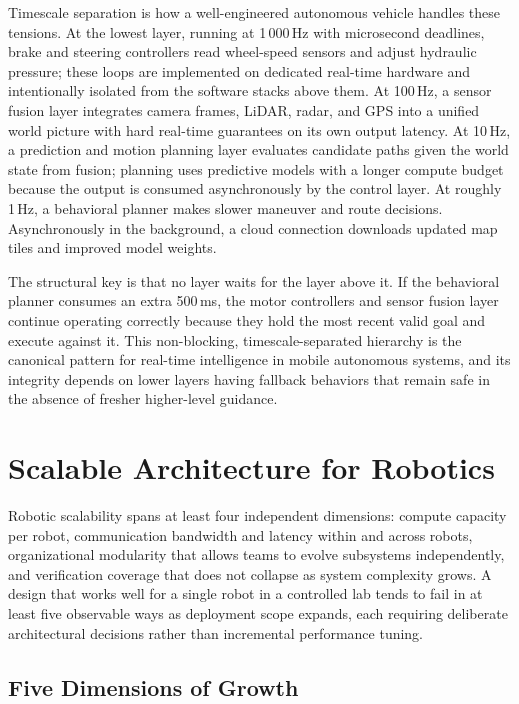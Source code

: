 \documentclass[smallextended]{svjour3}
\begin{document}
Timescale separation is how a well-engineered autonomous vehicle handles these tensions. At the lowest layer, running at 1\,000\,Hz with microsecond deadlines, brake and steering controllers read wheel-speed sensors and adjust hydraulic pressure; these loops are implemented on dedicated real-time hardware and intentionally isolated from the software stacks above them. At 100\,Hz, a sensor fusion layer integrates camera frames, LiDAR, radar, and GPS into a unified world picture with hard real-time guarantees on its own output latency. At 10\,Hz, a prediction and motion planning layer evaluates candidate paths given the world state from fusion; planning uses predictive models with a longer compute budget because the output is consumed asynchronously by the control layer. At roughly 1\,Hz, a behavioral planner makes slower maneuver and route decisions. Asynchronously in the background, a cloud connection downloads updated map tiles and improved model weights.

The structural key is that no layer waits for the layer above it. If the behavioral planner consumes an extra 500\,ms, the motor controllers and sensor fusion layer continue operating correctly because they hold the most recent valid goal and execute against it. This non-blocking, timescale-separated hierarchy is the canonical pattern for real-time intelligence in mobile autonomous systems, and its integrity depends on lower layers having fallback behaviors that remain safe in the absence of fresher higher-level guidance.
\section{Scalable Architecture for Robotics}
\label{sec:scale}

Robotic scalability spans at least four independent dimensions: compute capacity per robot, communication bandwidth and latency within and across robots, organizational modularity that allows teams to evolve subsystems independently, and verification coverage that does not collapse as system complexity grows. A design that works well for a single robot in a controlled lab tends to fail in at least five observable ways as deployment scope expands, each requiring deliberate architectural decisions rather than incremental performance tuning.

\subsection{Five Dimensions of Growth}
\end{document}
